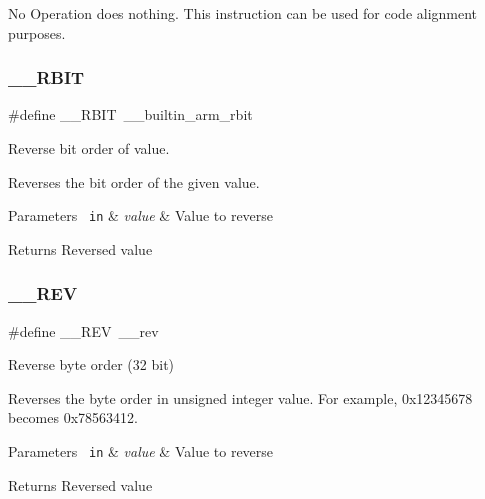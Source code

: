 No Operation does nothing. This instruction can be used for code alignment purposes. \mbox{\label{group___c_m_s_i_s___core___instruction_interface_gab83768933a612816fad669db5488366f}} 
\subsubsection{\texorpdfstring{\_\_RBIT}{\_\_RBIT}}
{\footnotesize\ttfamily \#define \+\_\+\+\_\+\+R\+B\+IT~\+\_\+\+\_\+builtin\+\_\+arm\+\_\+rbit}



Reverse bit order of value. 

Reverses the bit order of the given value. 
\begin{DoxyParams}[1]{Parameters}
\mbox{\texttt{ in}}  & {\em value} & Value to reverse \\
\hline
\end{DoxyParams}
\begin{DoxyReturn}{Returns}
Reversed value 
\end{DoxyReturn}
\mbox{\label{group___c_m_s_i_s___core___instruction_interface_ga14f54807872c0f5e05604c4924abfdae}} 
\subsubsection{\texorpdfstring{\_\_REV}{\_\_REV}\hspace{0.1cm}{\footnotesize\ttfamily [1/2]}}
{\footnotesize\ttfamily \#define \+\_\+\+\_\+\+R\+EV~\+\_\+\+\_\+rev}



Reverse byte order (32 bit) 

Reverses the byte order in unsigned integer value. For example, 0x12345678 becomes 0x78563412. 
\begin{DoxyParams}[1]{Parameters}
\mbox{\texttt{ in}}  & {\em value} & Value to reverse \\
\hline
\end{DoxyParams}
\begin{DoxyReturn}{Returns}
Reversed value 
\end{DoxyReturn}
\mbox{\label{group___c_m_s_i_s___core___instruction_interface_gaca25a02e09983da5558f5242f2f635bc}} 

